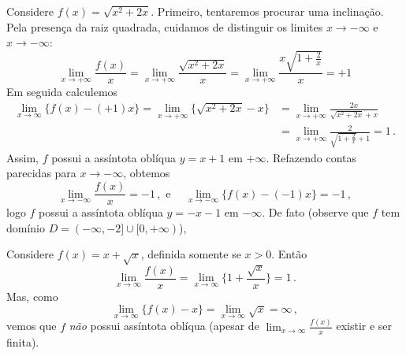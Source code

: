 \begin{ex}
Considere $f(x)=\sqrt{x^2+2x}$.
Primeiro, tentaremos procurar uma inclinação. Pela presença
da raiz quadrada, cuidamos de distinguir os
limites $x\to-\infty$ e $x\to-\infty$:
$$
\lim_{x\to +\infty}\frac{f(x)}{x}=\lim_{x\to+\infty}
\frac{\sqrt{x^2+2x}}{x}=\lim_{x\to +\infty}
\frac{x\sqrt{1+\tfrac{2}{x}}}{x}=+1
$$
Em seguida calculemos 
\begin{align*}
\lim_{x\to\infty}\{f(x)-(+1)x\}=\lim_{x\to+\infty}\{\sqrt{x^2+2x}-x\}
&=\lim_{x\to+\infty}\frac{2x}{\sqrt{x^2+2x}+x}\\
&=\lim_{x\to+\infty}\frac{2}{\sqrt{1+\frac{2}{x}}+1}=1\,.
\end{align*}
Assim, $f$ possui a assíntota oblíqua $y=x+1$ em
$+\infty$. Refazendo contas parecidas para $x\to-\infty$,
obtemos
$$
\lim_{x\to-\infty}\frac{f(x)}{x}=-1\,,\text{ e }\quad
\lim_{x\to-\infty}\{f(x)-(-1)x\}=-1\,,
$$
logo $f$ possui a assíntota oblíqua $y=-x-1$ em
$-\infty$. De fato (observe que $f$ tem domínio
$D=(-\infty,-2]\cup[0,+\infty)$),
\begin{center}
\begin{bmlimage}\end{bmlimage}
\end{center}
\end{ex}

\begin{ex}
Considere $f(x)=x+\sqrt{x}$, definida somente se $x>0$.
Então 
$$\lim_{x\to\infty}\frac{f(x)}{x}=
\lim_{x\to\infty}\bigl\{1+\frac{\sqrt{x}}{x}\bigr\}=1\,.
$$
Mas, como
$$
\lim_{x\to\infty}\{f(x)-x\}=\lim_{x\to\infty}\sqrt{x}=\infty\,,
$$
vemos que $f$ \emph{não} possui assíntota oblíqua (apesar de
$\lim_{x\to\infty}\frac{f(x)}{x}$ existir e ser finita).
\end{ex}

